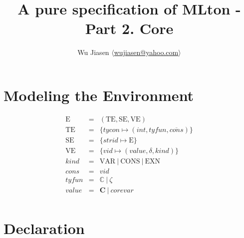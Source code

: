 \documentclass[11pt,a4paper]{article}
\newcommand{\braced}[1]{\{#1\}}
\newcommand{\Env}  {\textrm{E}}
\newcommand{\VE}   {\textrm{VE}}
\newcommand{\TE}   {\textrm{TE}}
\newcommand{\SE}   {\textrm{SE}}
\newcommand{\VKE}  {\textrm{EXN}}
\newcommand{\VKC}  {\textrm{CONS}}
\newcommand{\VKV}  {\textrm{VAR}}
\newcommand{\tycon}{\mathbb{C}}
\newcommand{\vcon} {\mathbf{C}}
\newcommand{\vect}[1]{\overline{#1}}
\begin{document}
\title {A pure specification of MLton - Part 2. Core}
\author{Wu Jiasen $\langle$\href{mailto:wujiasen@yahoo.com}{wujiasen@yahoo.com}$\rangle$}
\maketitle 
\thispagestyle{fancy}

\section {Modeling the Environment}
\[\begin{array}{lcl}
    \Env & = & (\TE,\SE,\VE)  \\
    \TE& = & \braced{tycon \mapsto (int, tyfun, \vect{cons})} \\
    \SE& = & \braced{strid \mapsto \Env}  \\ 
    \VE& = & \braced{vid   \mapsto (value,\delta, kind)} \\
    kind & = & \VKV\ |\ \VKC\ |\ \VKE \\
    cons & = & vid                    \\
    tyfun& = & \tycon\ |\ \zeta       \\
    value& = & \vcon\ |\ corevar      \\
\end{array}\]

\section{Declaration}
\end{document}
